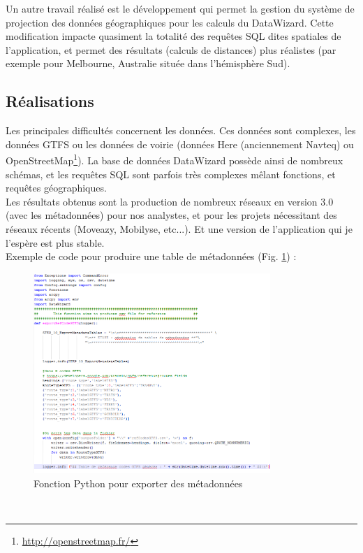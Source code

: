 \begin{itemize}
Un autre travail réalisé est le développement qui permet la gestion du système de projection des données géographiques pour les calculs du DataWizard. Cette modification impacte quasiment la totalité des requêtes SQL dites spatiales de l'application, et permet des résultats (calculs de distances) plus réalistes (par exemple pour Melbourne, Australie située dans l'hémisphère Sud).\\


\subsection{Réalisations}

Les principales difficultés concernent les données. Ces données sont complexes, les données GTFS ou les données de voirie (données Here (anciennement Navteq) ou OpenStreetMap\footnote{\url{http://openstreetmap.fr/}}). La base de données \og DataWizard \fg possède ainsi de nombreux schémas, et les requêtes SQL sont parfois très complexes mêlant fonctions, et requêtes géographiques.\\

Les résultats obtenus sont la production de nombreux réseaux en version 3.0 (avec les métadonnées) pour nos analystes, et pour les projets nécessitant des réseaux récents (Moveazy, Mobilyse, etc...). Et une version de l'application qui je l'espère est plus stable.\\

Exemple de code pour produire une table de métadonnées (Fig. \ref{CodeMetadata}) :
\\
\begin{figure}[h]
	\centering
		\includegraphics[width=0.8\textwidth]{images/DW_Fonction_Python.PNG}
	\caption{Fonction Python pour exporter des métadonnées}
	\label{CodeMetadata}
\end{figure}\\


\end{itemize}
